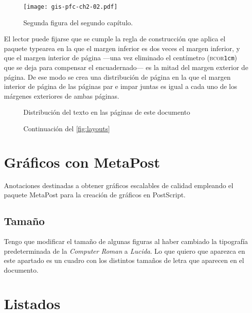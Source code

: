 \begin{figure}
	\begin{center}
		\texttt{[image: gis-pfc-ch2-02.pdf]}
	\end{center}
	\caption[Segunda figura del segundo capítulo]{Segunda figura del
	segundo capítulo.}
	\label{fig:ch102}
\end{figure}

El lector puede fijarse que se cumple la regla de construcción que aplica
el paquete \textsf{typearea} en la que el margen inferior es dos veces el
margen inferior, y que el margen interior de página ---una vez eliminado el
centímetro (\textsc{bcor}\texttt{1cm}) que se deja para compensar el
encuadernado--- es la mitad del margen exterior de página. De ese modo se
crea una distribución de página en la que el margen interior de página de
las páginas par e impar juntas es igual a cada uno de los márgenes
exteriores de ambas páginas.

\begin{figure}
	\pagediagram
	\caption{Distribución del texto en las páginas de este documento}
	\label{fig:layouts}
\end{figure}

\begin{figure}\ContinuedFloat
	\currentpage
	\pagedesign
	\caption[]{Continuación del \vref{fig:layouts}}
\end{figure}


\section{Gráficos con MetaPost}

Anotaciones destinadas a obtener gráficos escalables de calidad empleando
el paquete MetaPost para la creación de gráficos en PostScript.


\subsection{Tamaño}

Tengo que modificar el tamaño de algunas figuras al haber cambiado la
tipografía predeterminada de la \emph{Computer Roman} a \emph{Lucida}. Lo
que quiero que aparezca en este apartado es un cuadro con los distintos
tamaños de letra que aparecen en el documento.


\section{Listados}


